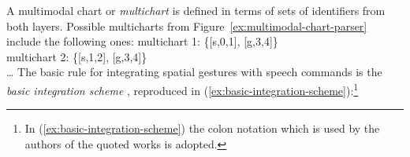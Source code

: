 \documentclass[output=paper
 	        ,biblatex
                ,babelshorthands
                ,newtxmath
                ,draftmode
                ,colorlinks, citecolor=brown
]{langscibook}
\begin{document}
A multimodal chart or \emph{multichart} is defined in terms of sets of identifiers from both layers.
%
Possible multicharts from Figure~\ref{ex:multimodal-chart-parser} include the following ones:
%
\ea
multichart 1: \{[s,0,1], [g,3,4]\} \\
multichart 2: \{[s,1,2], [g,3,4]\} \\
\ldots
\z
{}
%
%
%
The basic rule for integrating spatial gestures with speech commands is the \emph{basic integration scheme} \citep{Johnston:1998,Johnston:et:al:1997}, reproduced in (\ref{ex:basic-integration-scheme}):\footnote{In (\ref{ex:basic-integration-scheme}) the colon notation which is used by the authors of the quoted works is adopted.}
%
\ea \label{ex:basic-integration-scheme}
\z
\end{document}
